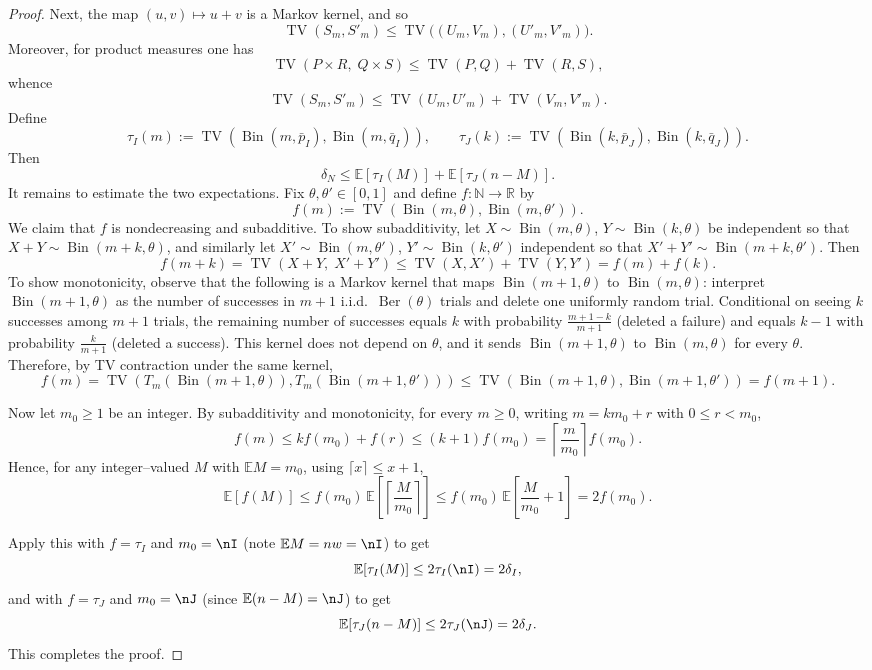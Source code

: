\documentclass[11pt]{amsart}
\theoremstyle{plain}
\theoremstyle{definition}
\DeclareMathOperator{\TV}{TV}
\DeclareMathOperator{\Bin}{Bin}
\DeclareMathOperator{\Ber}{Ber}
\newcommand{\R}{\mathbb{R}}
\newcommand{\N}{\mathbb{N}}
\newcommand{\E}{\mathbb{E}}
\newcommand{\mybin}[2]{\Bin(#1,#2)}
\begin{document}
\begin{proof}
Next, the map $(u,v)\mapsto u+v$ is a Markov kernel, and so
\[
\TV(S_m,S'_m)\le \TV\bigl((U_m,V_m),(U'_m,V'_m)\bigr).
\]
Moreover, for product measures one has
\begin{equation}
\label{eq:tv_product_bound}
\TV(P\times R,\;Q\times S)\le \TV(P,Q)+\TV(R,S),
\end{equation}
whence
\[
\TV(S_m,S'_m)\le \TV(U_m,U'_m)+\TV(V_m,V'_m).
\]
Define
\[
\tau_I(m):=\TV(\mybin{m}{\bar p_I},\mybin{m}{\bar q_I}),\qquad
\tau_J(k):=\TV(\mybin{k}{\bar p_J},\mybin{k}{\bar q_J}).
\]
Then
\[
\delta_{N}\le \E[\tau_I(M)]+\E[\tau_J(n-M)].
\]
It remains to estimate the two expectations.
Fix $\theta,\theta'\in[0,1]$ and define $f:\N\to\R$ by
\[
f(m):=\TV(\mybin{m}{\theta},\mybin{m}{\theta'}).
\]
We claim that $f$ is nondecreasing and subadditive.
To show subadditivity,
let $X\sim\mybin{m}{\theta}$, $Y\sim\mybin{k}{\theta}$ be independent so that
$X+Y\sim\mybin{m+k}{\theta}$, and similarly let $X'\sim\mybin{m}{\theta'}$,
$Y'\sim\mybin{k}{\theta'}$ independent so that $X'+Y'\sim\mybin{m+k}{\theta'}$.
Then
\[
f(m+k)=\TV(X+Y,\;X'+Y')\le \TV(X,X')+\TV(Y,Y')=f(m)+f(k).
\]
To show
monotonicity, observe that the following is a Markov kernel
that maps $\mybin{m+1}{\theta}$ to $\mybin{m}{\theta}$: interpret $\mybin{m+1}{\theta}$ as the number of successes in $m+1$ i.i.d.\ $\Ber(\theta)$ trials and delete one uniformly random trial.
Conditional on seeing $k$ successes among $m+1$ trials, the remaining number of successes equals $k$ with probability $\frac{m+1-k}{m+1}$ (deleted a failure) and equals $k-1$ with probability $\frac{k}{m+1}$ (deleted a success).
This kernel does not depend on $\theta$, and it sends $\mybin{m+1}{\theta}$ to $\mybin{m}{\theta}$ for every $\theta$.
Therefore, by TV contraction under the same kernel,
\[
f(m) = \TV(T_m(\mybin{m+1}{\theta}), T_m(\mybin{m+1}{\theta'})) \le \TV(\mybin{m+1}{\theta}, \mybin{m+1}{\theta'}) = f(m+1).
\]

Now let $m_0\ge 1$ be an integer. By subadditivity and monotonicity,
for every $m\ge 0$, writing $m=km_0+r$ with $0\le r<m_0$,
\[
f(m)\le kf(m_0)+f(r)\le (k+1)f(m_0)=\left\lceil\frac{m}{m_0}\right\rceil f(m_0).
\]
Hence, for any integer--valued $M$ with $\E M=m_0$, using $\lceil x\rceil\le x+1$,
\[
\E[f(M)]
\le f(m_0)\,\E\!\left[\left\lceil\frac{M}{m_0}\right\rceil\right]
\le f(m_0)\,\E\!\left[\frac{M}{m_0}+1\right]
=2f(m_0).
\]

Apply this with $f=\tau_I$ and $m_0=\nI$ (note $\E M=nw=\nI$) to get
\[
\E[\tau_I(M)]\le 2\tau_I(\nI)=2\delta_I,
\]
and with $f=\tau_J$ and $m_0=\nJ$ (since $\E(n-M)=\nJ$) to get
\[
\E[\tau_J(n-M)]\le 2\tau_J(\nJ)=2\delta_J.
\]
This completes the proof.
\end{proof}
\end{document}
